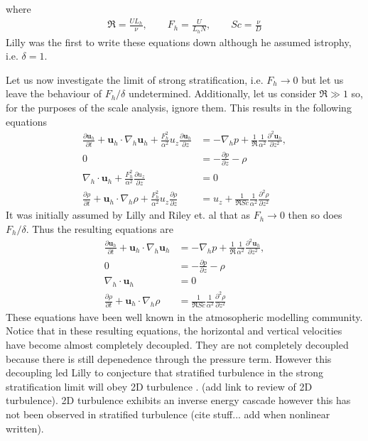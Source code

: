 where 
\begin{align}
\Re = \frac{UL_{h}}{\nu}, \qquad F_{h} = \frac{U}{L_{h}N},\qquad Sc = \frac{\nu}{D}
\end{align}
Lilly was the first to write these equations down although he assumed istrophy, i.e. $\delta=1$. 

Let us now investigate the limit of strong stratification, i.e. $F_{h}\rightarrow 0$ but let us leave the behaviour of $F_{h}/\delta$ undetermined. Additionally, let us consider $\Re\gg 1$ so, for the purposes of the scale analysis, ignore them. This results in the following equations 
\begin{align}
\frac{\partial \textbf{u}_{h}}{\partial t} + \textbf{u}_{h}\cdot\nabla_{h}\textbf{u}_{h}+\frac{F_{h}^{2}}{\alpha^{2}}u_{z}\frac{\partial \textbf{u}_{h}}{\partial z} &= -\nabla_{h}p + \frac{1}{\Re}\frac{1}{\alpha^{2}}\frac{\partial^{2}\textbf{u}_{h}}{\partial z^{2}},\\
0&= -\frac{\partial p}{\partial z} - \rho  \\
\nabla_{h}\cdot\textbf{u}_{h}+ \frac{F_{h}^{2}}{\alpha^{2}}\frac{\partial u_{z}}{\partial z} &=0\\
\frac{\partial \rho}{\partial t} + \textbf{u}_{h}\cdot\nabla_{h}\rho + \frac{F_{h}^{2}}{\alpha^{2}}u_{z}\frac{\partial \rho}{\partial z} &= u_{z} + \frac{1}{\Re Sc}\frac{1}{\alpha^{2}}\frac{\partial^{2}\rho}{\partial z^{2}} 
\end{align} 
It was initially assumed by Lilly \cite{lilly1983} and Riley et. al \cite{rileylelong2000} that as $F_{h}\rightarrow 0$ then so does $F_{h}/\delta$. Thus the resulting equations are 
\begin{align}
\frac{\partial \textbf{u}_{h}}{\partial t} + \textbf{u}_{h}\cdot\nabla_{h}\textbf{u}_{h} &= -\nabla_{h}p + \frac{1}{\Re}\frac{1}{\alpha^{2}}\frac{\partial^{2}\textbf{u}_{h}}{\partial z^{2}},\\
0&= -\frac{\partial p}{\partial z} - \rho  \\
\nabla_{h}\cdot\textbf{u}_{h} &=0\\
\frac{\partial \rho}{\partial t} + \textbf{u}_{h}\cdot\nabla_{h}\rho &= \frac{1}{\Re Sc}\frac{1}{\alpha^{2}}\frac{\partial^{2}\rho}{\partial z^{2}} 
\end{align} 
These equations have been well known in the atmosopheric modelling community. Notice that in these resulting equations, the horizontal and vertical velocities have become almost completely decoupled. They are not completely decoupled because there is still depenedence through the pressure term. However this decoupling led Lilly to conjecture that stratified turbulence in the strong stratification limit will obey 2D turbulence \cite{lilly1983}. (add link to review of 2D turbulence). 2D turbulence exhibits an inverse energy cascade however this has not been observed in stratified turbulence (cite stuff... add when nonlinear written).


